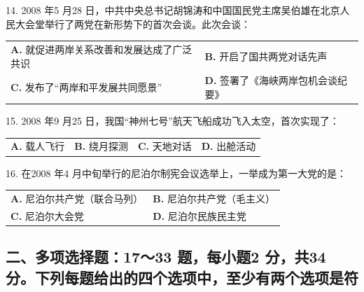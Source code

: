 \documentclass[UTF8,11pt]{ctexart}
\begin{document}
14. 2008 年5 月28 日，中共中央总书记胡锦涛和中国国民党主席吴伯雄在北京人民大会堂举行了两党在新形势下的首次会谈。此次会谈：


\begin{center}\begin{tabular}{>{\raggedright\arraybackslash}p{\dimexpr(\linewidth-4\tabcolsep)/2\relax}>{\raggedright\arraybackslash}p{\dimexpr(\linewidth-4\tabcolsep)/2\relax}}
\textbf{A.} 就促进两岸关系改善和发展达成了广泛共识 & \textbf{B.} 开启了国共两党对话先声\\[.35em]
\textbf{C.} 发布了“两岸和平发展共同愿景” & \textbf{D.} 签署了《海峡两岸包机会谈纪要》\\[.35em]\end{tabular}\end{center}

15. 2008 年9 月25 日，我国“神州七号”航天飞船成功飞入太空，首次实现了：


\begin{center}\begin{tabular}{>{\raggedright\arraybackslash}p{\dimexpr(\linewidth-8\tabcolsep)/4\relax}>{\raggedright\arraybackslash}p{\dimexpr(\linewidth-8\tabcolsep)/4\relax}>{\raggedright\arraybackslash}p{\dimexpr(\linewidth-8\tabcolsep)/4\relax}>{\raggedright\arraybackslash}p{\dimexpr(\linewidth-8\tabcolsep)/4\relax}}
\textbf{A.} 载人飞行 & \textbf{B.} 绕月探测 & \textbf{C.} 天地对话 & \textbf{D.} 出舱活动\\[.35em]\end{tabular}\end{center}

16. 在2008 年4 月中旬举行的尼泊尔制宪会议选举上，一举成为第一大党的是：


\begin{center}\begin{tabular}{>{\raggedright\arraybackslash}p{\dimexpr(\linewidth-4\tabcolsep)/2\relax}>{\raggedright\arraybackslash}p{\dimexpr(\linewidth-4\tabcolsep)/2\relax}}
\textbf{A.} 尼泊尔共产党（联合马列） & \textbf{B.} 尼泊尔共产党（毛主义）\\[.35em]
\textbf{C.} 尼泊尔大会党 & \textbf{D.} 尼泊尔民族民主党\\[.35em]\end{tabular}\end{center}

\subsection*{二、多项选择题：17～33 题，每小题2 分，共34 分。下列每题给出的四个选项中，至少有两个选项是符}
\end{document}
